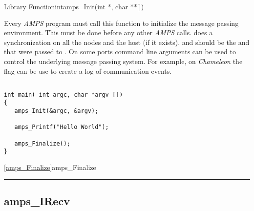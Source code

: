 \begin{deftypefn}{Library Function}{int}{amps\_Init}(int *, char **[])
\DESCRIPTION

Every {\em AMPS} program must call this function to initialize the
message passing environment.  This must be done before any other
{\em AMPS} calls.   does a synchronization on all the
nodes and the host (if it exists).   and  should be
the  and  that were passed to .  On some
ports command line arguments can be used to control the underlying
message passing system.  For example, on {\em Chameleon} the
 flag can be use to create a log of communication events.

\EXAMPLE

\begin{display}\begin{verbatim}

int main( int argc, char *argv [])
{
   amps_Init(&argc, &argv);

   amps_Printf("Hello World");

   amps_Finalize();
}
\end{verbatim}\end{display}


\SEEALSO
\vref{amps_Finalize}{amps\_Finalize} \\

\end{deftypefn}


\noindent\rule{\textwidth}{1mm}

\subsection{amps\_IRecv}
\label{amps_IRecv}


